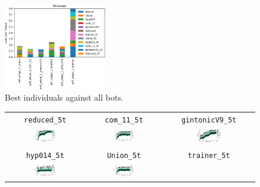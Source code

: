 \documentclass[11pt,a4paper]{scrartcl}
\begin{document}
\begin{figure}[H]
\center
\includegraphics[width=0.4\textwidth]{img/self_adapt_1.png}
\caption{Best individuals against all bots.}
\label{fig:self_adapt_1_aa}
\end{figure}

\begin{figure}[H]
\center
\begin{tabular}{ccc}
\texttt{reduced\_5t} & \texttt{com\_11\_5t} & \texttt{gintonicV9\_5t} \\
\includegraphics[width=0.3\textwidth]{img/self_adapt_1_reduced_5t.png} &
\includegraphics[width=0.3\textwidth]{img/self_adapt_1_com_11_5t.png} &
\includegraphics[width=0.3\textwidth]{img/self_adapt_1_gintonicV9_5t.png} \\
\texttt{hyp014\_5t} & \texttt{Union\_5t} & \texttt{trainer\_5t} \\
\includegraphics[width=0.3\textwidth]{img/self_adapt_1_hyp014_5t.png} &
\includegraphics[width=0.3\textwidth]{img/self_adapt_1_Union_5t.png} &

\end{tabular}
\end{figure}
\end{document}
